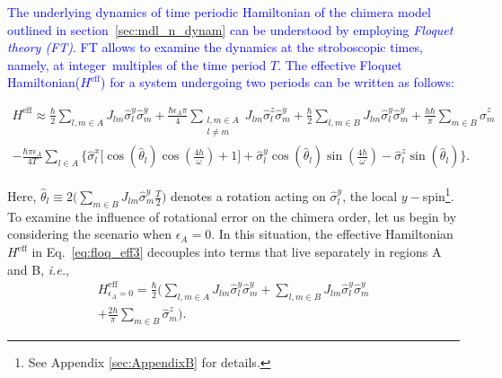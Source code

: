 \documentclass[
nofootinbib,
reprint,
superscriptaddress,
amsmath,amssymb,showkeys,
aps,
prb,
]{revtex4-2}
\newcommand{\blue}[1]{\textcolor{blue}{#1}}
\begin{document}
	\blue{The underlying dynamics of time periodic Hamiltonian of the chimera model outlined in section~\ref{sec:mdl_n_dynam} can be understood by employing \textit{Floquet theory (FT)}. FT allows to examine the dynamics at the stroboscopic times, namely, at integer multiples of the time period $T$. The effective Floquet Hamiltonian($H^{\mathrm{eff}}$) for a system undergoing two periods can be written as follows:}
	\begin{widetext}
		\begin{multline}
			H^{\mathrm{eff}} \approx\frac{\hbar}{2} \sum_{l,m\in A}J_{lm}\hat{\sigma}_l^y\hat{\sigma}_m^y +\frac{\hbar \epsilon_A \pi}{4} \sum_{\substack{l,m\in A\\l\neq m}} J_{lm}\hat{\sigma}^z_l\hat{\sigma}^y_m + \frac{\hbar}{2}\sum_{l,m\in B}J_{lm}\hat{\sigma}_l^y \hat{\sigma}_m^y + \frac{h\hbar}{\pi}\sum_{m \in B}\hat{\sigma}^z_m \\ -\frac{\hbar \pi \epsilon_A}{4T}\sum_{l\in A}\Bigg\{\hat{\sigma}^x_l \bigg[\cos(\hat{\theta}_l)\cos(\frac{4h}{\omega})+1 \bigg] + \hat{\sigma}^y_l \cos(\hat{\theta}_l)\sin(\frac{4h}{\omega})-\hat{\sigma}^z_l \sin(\hat{\theta}_l)\Bigg\}.
			\label{eq:floq_eff3}
		\end{multline}
	\end{widetext}
	Here, $\displaystyle \hat{\theta}_l \equiv 2 \Big(\sum_{m \in B}J_{lm}\hat{\sigma}^y_m \frac{T}{2} \Big)$ denotes a rotation acting on $\hat{\sigma}^y_l$, the local $y-$spin\footnote{See Appendix \ref{sec:AppendixB} for details.}. 
	To examine the influence of rotational error on the chimera order, let us begin by considering the scenario when $\epsilon_A=0$. In this situation, the effective Hamiltonian $H^\mathrm{eff}$ in Eq.~\eqref{eq:floq_eff3}  decouples into terms that live separately in regions A and B, \textit{i.e.},
	\begin{multline}
		H^{\mathrm{eff}}_{\epsilon_A=0} =  \frac{\hbar}{2}\Bigg( \sum_{l,m\in A} J_{lm} \hat{\sigma}^y_l\hat{\sigma}^y_m +\sum_{l,m\in B} J_{lm} \hat{\sigma}^y_l\hat{\sigma}^y_m\\+\frac{2h }{\pi}\sum_{m \in B}\hat{\sigma}^z_m\Bigg).
	\end{multline}
	
\end{document}
